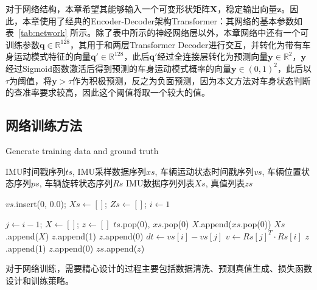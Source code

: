 对于网络结构，本章希望其能够输入一个可变形状矩阵$\symbf{X}$，稳定输出向量$\symbf{z}$。因此，本章使用了经典的Encoder-Decoder架构Transformer\cite{vaswani2017attention}：其网络的基本参数如表~\ref{tab:network} 所示。除了表中所示的神经网络层以外，本章网络中还有一个可训练参数$\symbf{q} \in \mathbb{R}^{128}$，其用于和两层Transformer Decoder进行交互，并转化为带有车身运动模式特征的向量$\symbf{q}' \in \mathbb{R}^{128}$，此后$\symbf{q}'$经过全连接层转化为预测向量$\symbf{y} \in \mathbb{R}^2$，$\symbf{y}$经过Sigmoid函数激活后得到预测的车身运动模式概率的向量$\symbf{y} \in (0, 1)^2$，此后以$\tau$为阈值，将$\symbf{y} > \tau$作为积极预测，反之为负面预测，因为本文方法对车身状态判断的查准率要求较高，因此这个阈值将取一个较大的值。

\subsection{网络训练方法}

\renewcommand{\algorithmicrequire}{\textbf{输入：}\unskip}
\renewcommand{\algorithmicensure}{\textbf{输出：}\unskip}
\begin{algorithm}
  \caption{Generate training data and ground truth}
  \label{alg1}
  \small
  \begin{algorithmic}[1]
    \REQUIRE IMU时间戳序列$ts$, IMU采样数据序列$xs$, 车辆运动状态时间戳序列$vs$, 车辆位置状态序列$ps$, 车辆旋转状态序列$Rs$
    \ENSURE IMU数据序列列表$Xs$, 真值列表$zs$

    \STATE $vs$.insert(0, 0.0); $Xs \leftarrow []$; $Zs \leftarrow []$; $i \leftarrow 1$

      \STATE $j \leftarrow i-1$; $X \leftarrow []$; $z \leftarrow []$
        \STATE $ts$.pop(0), $xs$.pop(0)
      \ENDWHILE
        \STATE $X$.append($xs$.pop(0))
      \ENDWHILE
      \STATE $Xs$.append($X$)
        \STATE $z$.append(1)
      \ELSE
        \STATE $z$.append(0)
      \ENDIF
      \STATE $dt \leftarrow vs[i] - vs[j]$
      \STATE $v \leftarrow Rs[j]^T \cdot Rs[i]$
        \STATE $z$.append(1)
      \ELSE
        \STATE $z$.append(0)
      \ENDIF
      \STATE $zs$.append($z$)
    \ENDWHILE
  \end{algorithmic}
\end{algorithm}

对于网络训练，需要精心设计的过程主要包括数据清洗、预测真值生成、损失函数设计和训练策略。

